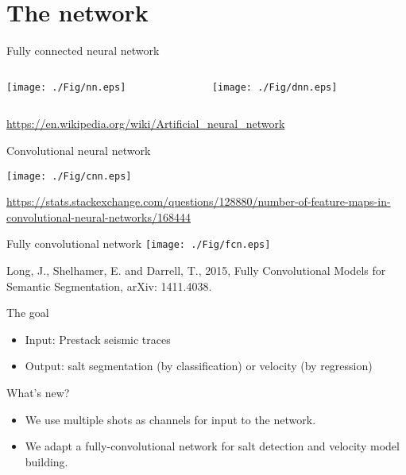 \documentclass[aspectratio=169]{beamer}
\begin{document}
\section{The network}
\begin{frame}{Fully connected neural network}

\begin{columns}
  \begin{column}{0.50\textwidth}
    \center
    \texttt{[image: ./Fig/nn.eps]}
  \end{column}
  \begin{column}{0.50\textwidth}
    \center
    \texttt{[image: ./Fig/dnn.eps]}
  \end{column}
\end{columns}

\tiny{\url{https://en.wikipedia.org/wiki/Artificial_neural_network}}
\end{frame}
\begin{frame}{Convolutional neural network}

\center
\texttt{[image: ./Fig/cnn.eps]}

\tiny{\url{https://stats.stackexchange.com/questions/128880/number-of-feature-maps-in-convolutional-neural-networks/168444}}
\end{frame}
\begin{frame}{Fully convolutional network}
    \center
    \texttt{[image: ./Fig/fcn.eps]}

\tiny{Long, J., Shelhamer, E. and Darrell, T., 2015, Fully Convolutional Models for Semantic Segmentation, arXiv: 1411.4038.}
\end{frame}
\begin{frame}
\begin{block}{The goal}
\begin{itemize}
\item{Input: Prestack seismic traces}
\item{Output: salt segmentation (by classification) or velocity (by regression)}
\end{itemize}
\end{block}
\begin{block}{What's new?}
\begin{itemize}
\item{We use multiple shots as channels for input to the network.}
\item{We adapt a fully-convolutional network for salt detection and velocity model building.}
\end{itemize}
\end{block}
\end{frame}
\end{document}
